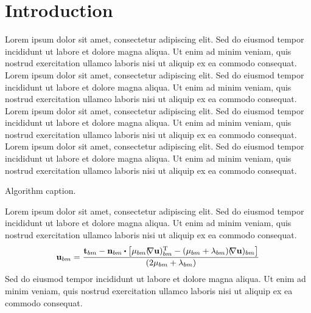 \section{Introduction}
\label{sec:Metho:intro}
%
%
%
Lorem ipsum dolor sit amet, consectetur adipiscing elit. 
Sed do eiusmod tempor incididunt ut labore et dolore magna aliqua. 
Ut enim ad minim veniam, quis nostrud exercitation ullamco laboris nisi ut aliquip ex ea commodo consequat.
Lorem ipsum dolor sit amet, consectetur adipiscing elit. 
Sed do eiusmod tempor incididunt ut labore et dolore magna aliqua. 
Ut enim ad minim veniam, quis nostrud exercitation ullamco laboris nisi ut aliquip ex ea commodo consequat.
Lorem ipsum dolor sit amet, consectetur adipiscing elit. 
Sed do eiusmod tempor incididunt ut labore et dolore magna aliqua. 
Ut enim ad minim veniam, quis nostrud exercitation ullamco laboris nisi ut aliquip ex ea commodo consequat.
Lorem ipsum dolor sit amet, consectetur adipiscing elit. 
Sed do eiusmod tempor incididunt ut labore et dolore magna aliqua. 
Ut enim ad minim veniam, quis nostrud exercitation ullamco laboris nisi ut aliquip ex ea commodo consequat.
%
\begin{algorithm}[H]
\caption{Algorithm caption.}
\label{alg:ct:force}
\begin{algorithmic}[1] \footnotesize
{}
\EndIf
\EndIf
\end{algorithmic}
\end{algorithm}
%
Lorem ipsum dolor sit amet, consectetur adipiscing elit. 
Sed do eiusmod tempor incididunt ut labore et dolore magna aliqua. 
Ut enim ad minim veniam, quis nostrud exercitation ullamco laboris nisi ut aliquip ex ea commodo consequat.
%
\begin{equation}
\vec{u}_{bm}  = \frac{\vec{t}_{bm} - \vec{n}_{bm} \cdot \left[\mu_{bm} (\grad \vec{u})^{\transpose}_{bm}-(\mu_{bm}+\lambda_{bm})(\grad \vec{u})_{bm}\right] }{(2\mu_{bm}+\lambda_{bm})}
\label{eq:startEqMaster}
\end{equation}
Sed do eiusmod tempor incididunt ut labore et dolore magna aliqua. 
Ut enim ad minim veniam, quis nostrud exercitation ullamco laboris nisi ut aliquip ex ea commodo consequat.
